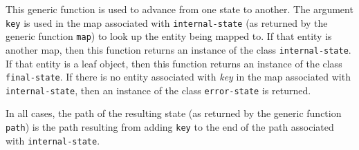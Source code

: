 This generic function is used to advance from one state to another.
The argument \texttt{key} is used in the map associated with
\texttt{internal-state} (as returned by the generic function
\texttt{map}) to look up the entity being mapped to.  If that entity
is another map, then this function returns an instance of the class
\texttt{internal-state}.  If that entity is a leaf object, then this
function returns an instance of the class \texttt{final-state}.  If
there is no entity associated with \emph{key} in the map associated
with \texttt{internal-state}, then an instance of the class
\texttt{error-state} is returned.

In all cases, the path of the resulting state (as returned by the
generic function \texttt{path}) is the path resulting from adding
\texttt{key} to the end of the path associated with
\texttt{internal-state}.
